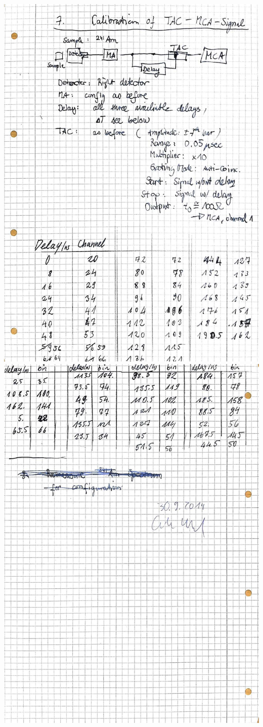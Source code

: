     \includegraphics[width=\linewidth]{records/page9.jpeg}
    \includegraphics[width=\linewidth]{records/page10.jpeg}
\clearpage

